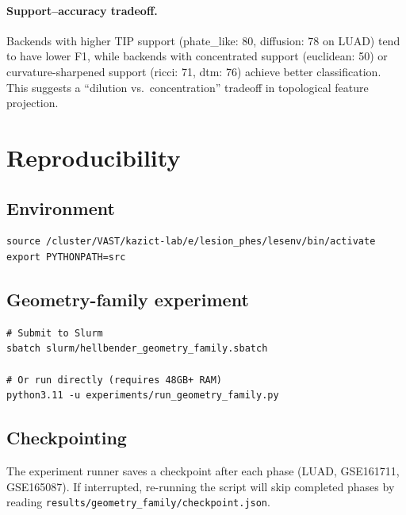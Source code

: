 \documentclass[11pt]{article}
\begin{document}
\paragraph{Support--accuracy tradeoff.}
Backends with higher TIP support (phate\_like: 80, diffusion: 78 on LUAD) tend to have lower F1, while backends with concentrated support (euclidean: 50) or curvature-sharpened support (ricci: 71, dtm: 76) achieve better classification.
This suggests a ``dilution vs.\ concentration'' tradeoff in topological feature projection.

\section{Reproducibility}
\label{sec:repro}

\subsection{Environment}
\begin{verbatim}
source /cluster/VAST/kazict-lab/e/lesion_phes/lesenv/bin/activate
export PYTHONPATH=src
\end{verbatim}

\subsection{Geometry-family experiment}
\begin{verbatim}
# Submit to Slurm
sbatch slurm/hellbender_geometry_family.sbatch

# Or run directly (requires 48GB+ RAM)
python3.11 -u experiments/run_geometry_family.py
\end{verbatim}

\subsection{Checkpointing}
The experiment runner saves a checkpoint after each phase (LUAD, GSE161711, GSE165087).
If interrupted, re-running the script will skip completed phases by reading \texttt{results/geometry\_family/checkpoint.json}.
\end{document}
